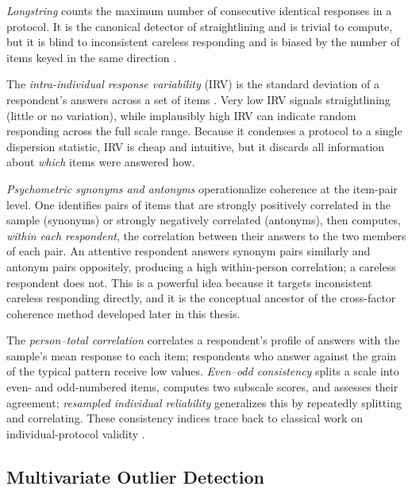 \emph{Longstring} counts the maximum number of consecutive identical responses
in a protocol. It is the canonical detector of straightlining and is trivial to
compute, but it is blind to inconsistent careless responding and is biased by
the number of items keyed in the same direction \parencite{johnson2005ascertaining,
meade2012identifying}.

The \emph{intra-individual response variability} (IRV) is the standard deviation
of a respondent's answers across a set of items \parencite{dunn2018intra}. Very
low IRV signals straightlining (little or no variation), while implausibly high
IRV can indicate random responding across the full scale range. Because it
condenses a protocol to a single dispersion statistic, IRV is cheap and
intuitive, but it discards all information about \emph{which} items were answered
how.

\emph{Psychometric synonyms and antonyms} \parencite{meade2012identifying}
operationalize coherence at the item-pair level. One identifies pairs of items
that are strongly positively correlated in the sample (synonyms) or strongly
negatively correlated (antonyms), then computes, \emph{within each respondent},
the correlation between their answers to the two members of each pair. An
attentive respondent answers synonym pairs similarly and antonym pairs
oppositely, producing a high within-person correlation; a careless respondent
does not. This is a powerful idea because it targets inconsistent careless
responding directly, and it is the conceptual ancestor of the cross-factor
coherence method developed later in this thesis.

The \emph{person--total correlation} correlates a respondent's profile of
answers with the sample's mean response to each item; respondents who answer
against the grain of the typical pattern receive low values. \emph{Even--odd
consistency} splits a scale into even- and odd-numbered items, computes two
subscale scores, and assesses their agreement; \emph{resampled individual
reliability} generalizes this by repeatedly splitting and correlating. These
consistency indices trace back to classical work on individual-protocol
validity \parencite{jackson1976jackson, johnson2005ascertaining}.

\subsection{Multivariate Outlier Detection}

